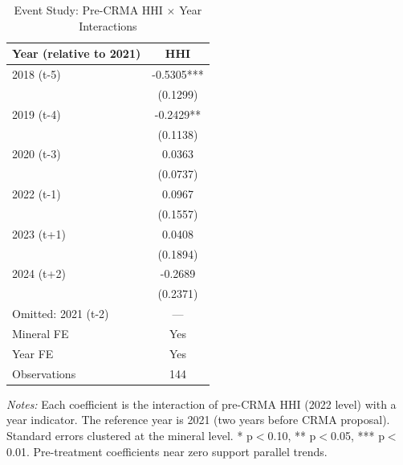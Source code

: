 \begin{table}[H]
\centering
\caption{Event Study: Pre-CRMA HHI $\times$ Year Interactions}
\label{tab:event}
\begin{threeparttable}
\begin{tabular}{lc}
\toprule
Year (relative to 2021) & HHI \\
\midrule
2018 (t-5) & -0.5305*** \\
& (0.1299) \\[3pt]
2019 (t-4) & -0.2429** \\
& (0.1138) \\[3pt]
2020 (t-3) & 0.0363 \\
& (0.0737) \\[3pt]
2022 (t-1) & 0.0967 \\
& (0.1557) \\[3pt]
2023 (t+1) & 0.0408 \\
& (0.1894) \\[3pt]
2024 (t+2) & -0.2689 \\
& (0.2371) \\[3pt]

\midrule
Omitted: 2021 (t-2) & --- \\
Mineral FE & Yes \\
Year FE & Yes \\
Observations & 144 \\
\bottomrule
\end{tabular}
\begin{tablenotes}[flushleft]
\small
\item \textit{Notes:} Each coefficient is the interaction of pre-CRMA HHI (2022 level) with a year indicator. The reference year is 2021 (two years before CRMA proposal). Standard errors clustered at the mineral level. * p$<$0.10, ** p$<$0.05, *** p$<$0.01. Pre-treatment coefficients near zero support parallel trends.
\end{tablenotes}
\end{threeparttable}
\end{table}
